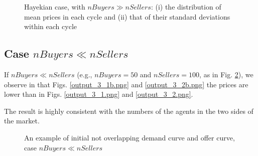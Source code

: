 \documentclass[12pt]{report}
\begin{document}
\begin{appendices}
\begin{figure}[htbp]
\begin{center}
\caption{Hayekian case, with $nBuyers \gg nSellers$: (i) the distribution of mean prices in each cycle and (ii) that of their standard deviations within each cycle}
\label{output_3_2a.png}
\end{center}
\end{figure}

\subsection{Case $nBuyers \ll nSellers$}
If $nBuyers \ll nSellers$ (e.g., $nBuyers=50$ and $nSellers=100$, as in Fig. \ref{output_2_1b.png}), we observe in that Figs. \ref{output_3_1b.png} and \ref{output_3_2b.png} the prices are lower than in Figs. \ref{output_3_1.png} and \ref{output_3_2.png}.

The result is highly consistent with the numbers of the agents in the two sides of the market.


\begin{figure}[htbp]
\begin{center}
\caption{An example of initial not overlapping demand curve and offer curve, case $nBuyers \ll nSellers$}
\label{output_2_1b.png}
\end{center}
\end{figure}


\end{appendices}
\end{document}
